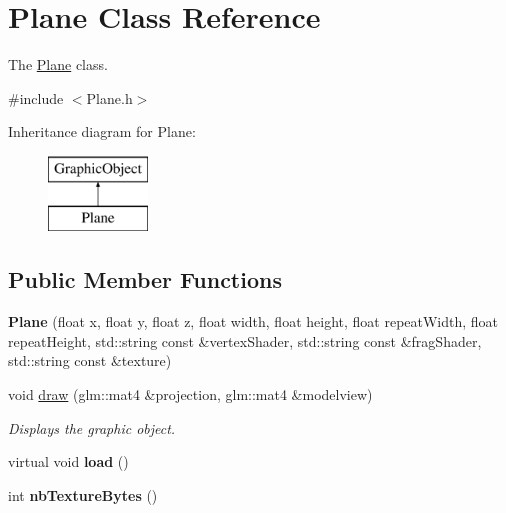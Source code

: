 \hypertarget{classPlane}{}\section{Plane Class Reference}
\label{classPlane}


The \hyperlink{classPlane}{Plane} class.  




{\ttfamily \#include $<$Plane.\+h$>$}

Inheritance diagram for Plane\+:\begin{figure}[H]
\begin{center}
\leavevmode
\includegraphics[height=2.000000cm]{classPlane}
\end{center}
\end{figure}
\subsection*{Public Member Functions}
\begin{DoxyCompactItemize}
\item 
\hypertarget{classPlane_a63651155afec5a2c904a80ec9b87335c}{}{\bfseries Plane} (float x, float y, float z, float width, float height, float repeat\+Width, float repeat\+Height, std\+::string const \&vertex\+Shader, std\+::string const \&frag\+Shader, std\+::string const \&texture)\label{classPlane_a63651155afec5a2c904a80ec9b87335c}

\item 
void \hyperlink{classPlane_ac046dce6b4226e86fbcaf850fa7e30fd}{draw} (glm\+::mat4 \&projection, glm\+::mat4 \&modelview)
\begin{DoxyCompactList}\small\item\em Displays the graphic object. \end{DoxyCompactList}\item 
\hypertarget{classPlane_a6dc72a0c50fad122fabfbd0bd73e6b75}{}virtual void {\bfseries load} ()\label{classPlane_a6dc72a0c50fad122fabfbd0bd73e6b75}

\item 
\hypertarget{classPlane_a678ea174d88d8615e89d2b5e03f9b537}{}int {\bfseries nb\+Texture\+Bytes} ()\label{classPlane_a678ea174d88d8615e89d2b5e03f9b537}

\end{DoxyCompactItemize}
